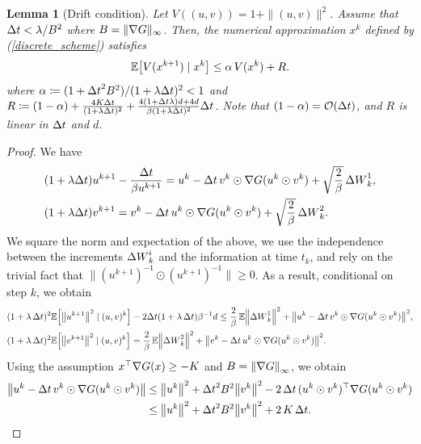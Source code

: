 \documentclass[11pt, twoside]{report}
\newtheorem{lemma}[theorem]{Lemma}
\begin{document}
\begin{lemma}[Drift condition]\label{lem:2ndmoments_discrete}
Let $V((u,v))=1+\|(u,v)\|^2$.
Assume that ${\Delta t}  < \lambda/B^2$ where $B=\|\nabla G\|_\infty$. Then, the numerical approximation $x^k$ defined by (\ref{discrete_scheme}) satisfies
    $$
   \EE \bp{ V(x^{k+1})  \mid x^k}\leq \alpha\,  V(x^k)  +R .
    $$
    where $\alpha \coloneq (1+{\Delta t}^2 B^2)/ (1+\lambda {\Delta t})^2  <1$ and
    $R\coloneq (1-\alpha) +  \frac{4K {\Delta t}}{(1+\lambda {\Delta t})^2  } + \frac{4(1+{\Delta t} \lambda)d + 4d}{\beta (1+\lambda {\Delta t})^2  }{\Delta t}$. Note that $(1-\alpha) = \mathcal{O}({\Delta t})$, and $R$ is linear in ${\Delta t}$ and $d$.
\end{lemma}
\begin{proof} We have
    \begin{align}
        &(1+ \lambda {\Delta t}) u^{k+1} - \frac{{\Delta t}}{\beta u^{k+1}} = u^k - {\Delta t} \,v^k \odot \nabla G(u^k\odot v^k) + \sqrt{\frac{2}{\beta}} \,{\Delta W}^1_k,\\
         &(1+ \lambda {\Delta t}) v^{k+1} = v^k - {\Delta t}\, u^k \odot \nabla G(u^k \odot v^k) + \sqrt{\frac{2}{\beta}} \,{\Delta W}^2_k.
    \end{align}
    We square the norm and expectation of the above, we use the independence between the increments ${\Delta W}^i_k$ and the information at time $t_k$, and rely on the trivial fact that $\|(u^{k+1})^{-1} \odot (u^{k+1})^{-1}\| \geq 0$. 
    As a result, conditional on step $k$, we obtain 
    \begin{align*}
        &(1+ \lambda \,\deltat)^2 \EE \bp{\norm{u^{k+1}}^2\mid (u,v)^k} - 2\deltat (1+\lambda\, \deltat)\beta^{-1} d  \leq 
        {\frac{2}{\beta}}\, \EE \norm{\deltaw^1_k}^2 
          + \norm{u^k - \deltat \,v^k \odot \nabla G(u^k \odot v^k) }^2, \\
         &(1+ \lambda \,\deltat)^2 \EE\bp{\norm{v^{k+1}}^2\mid (u,v)^k}  = \frac{2}{\beta} \,\EE\norm{ \deltaw^2_k}^2  + \norm{v^k - \deltat\, u^k \odot \nabla G(u^k\odot v^k)}^2.
    \end{align*}
Using the assumption $x^\top \nabla G(x) \geq -K$ and $B=\left\lVert\nabla G\right\rVert_\infty$, we obtain 
    \begin{align*}
        \norm{u^k-\deltat \,v^k \odot \nabla G(u^k\odot  v^k)} &\leq \norm{u^k}^2  + \deltat^2 \cinfty^2 \norm{v^k}^2 - 2 \,\Delta t\,(u^k \odot v^k)^\top \nabla G(u^k \odot v^k)\\
        &\leq \norm{u^k}^2  + \deltat^2 \cinfty^2 \norm{v^k}^2 +2\,\ccc\,\deltat.
    \end{align*}

\end{proof}
\end{document}
